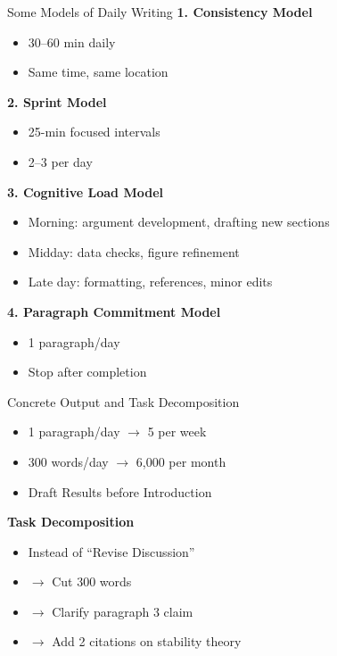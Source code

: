 \documentclass{beamer}
\begin{document}
\begin{frame}{Some Models of Daily Writing}
\small
\textbf{1. Consistency Model}
\begin{itemize}
    \item 30--60 min daily
    \item Same time, same location
\end{itemize}

\textbf{2. Sprint Model}
\begin{itemize}
    \item 25-min focused intervals
    \item 2--3 per day
\end{itemize}

\textbf{3. Cognitive Load Model}
\begin{itemize}
    \item Morning: argument development, drafting new sections
    \item Midday: data checks, figure refinement
    \item Late day: formatting, references, minor edits
\end{itemize}

\textbf{4. Paragraph Commitment Model}
\begin{itemize}
    \item 1 paragraph/day
    \item Stop after completion
\end{itemize}
\end{frame}


\begin{frame}{Concrete Output and Task Decomposition}
\begin{itemize}
    \item 1 paragraph/day $\rightarrow$ 5 per week
    \item 300 words/day $\rightarrow$ 6,000 per month
    \item Draft Results before Introduction
\end{itemize}

\vspace{0.5em}

\textbf{Task Decomposition}
\begin{itemize}
    \item Instead of “Revise Discussion”
    \item[] $\rightarrow$ Cut 300 words
    \item[] $\rightarrow$ Clarify paragraph 3 claim
    \item[] $\rightarrow$ Add 2 citations on stability theory
\end{itemize}
\end{frame}
\end{document}
